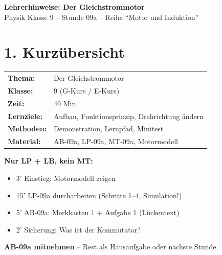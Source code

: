 \documentclass[11pt, a4paper]{article}
\newcommand{\fach}{Physik}
\newcommand{\thema}{Der Gleichstrommotor}
\newcommand{\klasse}{9}
\newcommand{\stession}{09a}
\newcommand{\reihe}{Motor und Induktion}
\newcommand{\dauer}{40 Min.}
\begin{document}

\begin{center}
{\Large\textbf{\textcolor{fachfarbe}{Lehrerhinweise: \thema}}}\\[0.3em]
{\normalsize \fach{} Klasse \klasse{} -- Stunde \stession{} -- Reihe ``\reihe''}
\end{center}

\vspace{1em}


\section*{1. Kurzübersicht}

\begin{infobox}
\begin{tabular}{ll}
\textbf{Thema:} & \thema{} \\
\textbf{Klasse:} & \klasse{} (G-Kurs / E-Kurs) \\
\textbf{Zeit:} & \dauer \\
\textbf{Lernziele:} & Aufbau, Funktionsprinzip, Drehrichtung ändern \\
\textbf{Methoden:} & Demonstration, Lernpfad, Minitest \\
\textbf{Material:} & AB-\stession, LP-\stession, MT-\stession, Motormodell \\
\end{tabular}
\end{infobox}


\begin{warnbox}
\textbf{Nur LP + LB, kein MT:}
\begin{itemize}
    \item 3' Einstieg: Motormodell zeigen
    \item 15' LP-\stession{} durcharbeiten (Schritte 1--4, Simulation!)
    \item 5' AB-\stession: Merkkasten 1 + Aufgabe 1 (Lückentext)
    \item 2' Sicherung: Was ist der Kommutator?
\end{itemize}
\textbf{AB-\stession{} mitnehmen} -- Rest als Hausaufgabe oder nächste Stunde.
\end{warnbox}
\end{document}
